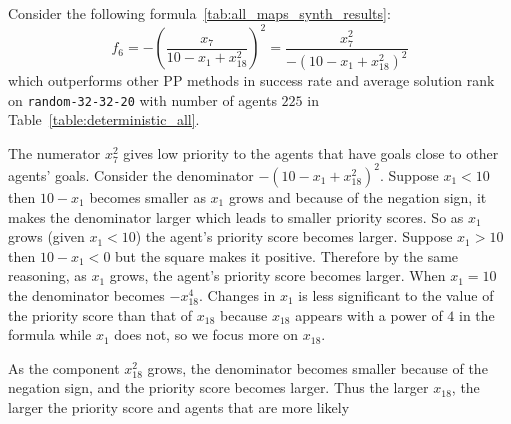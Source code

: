 Consider the following formula~\ref{tab:all_maps_synth_results}: $$ f_{6} =-\left(\frac{x_{7}}{10 - x_{1} + x_{18}^2}\right)^2 = \frac{x_{7}^2}{-(10 - x_{1} + x_{18}^2)^2} $$ which outperforms other PP methods in success rate and average solution rank on {\tt random-32-32-20} with number of agents $ 225 $ in Table~\ref{table:deterministic_all}.

The numerator $ x_7^2 $ gives low priority to the agents that have goals close to other agents' goals. Consider the denominator $ -(10 - x_{1} + x_{18}^2)^2 $. Suppose $ x_{1} < 10 $ then $ 10 - x_1 $ becomes smaller as $ x_1 $ grows and because of the negation sign, it makes the denominator larger which leads to smaller priority scores. So as $ x_1 $ grows (given $ x_1 < 10 $) the agent's priority score becomes larger. Suppose $ x_1 > 10 $ then $ 10 - x_1 < 0 $ but the square makes it positive. Therefore by the same reasoning, as $ x_1 $ grows, the agent's priority score becomes larger. When $ x_1 = 10 $ the denominator becomes $ -x_{18}^4 $. Changes in $ x_1 $ is less significant to the value of the priority score than that of $ x_{18} $ because $ x_{18} $ appears with a power of $ 4 $ in the formula while $ x_1 $ does not, so we focus more on $ x_{18} $.

As the component $ x_{18}^2 $ grows, the denominator becomes smaller because of the negation sign, and the priority score becomes larger. Thus the larger $ x_{18} $, the larger the priority score and agents that are more likely 

